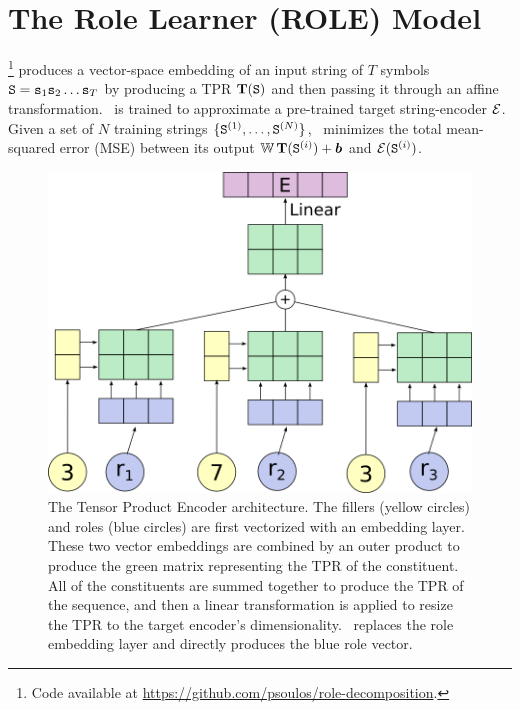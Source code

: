 \section{The Role Learner (ROLE) Model} \label{sec:Role-Learning} 

\RLN\footnote{Code available at \url{https://github.com/psoulos/role-decomposition}.} produces a vector-space embedding of an input string of $T$ symbols ${\mathtt{S}} = {\mathtt{s}}_1 {\mathtt{s}}_2 \ldots {\mathtt{s}}_T$ by producing a TPR ${\mathbf{T}}({\mathtt{S}})$ and then passing it through an affine transformation.
\RLN\ is trained to approximate a pre-trained target string-encoder ${\mathcal{E}}$.
Given a set of $N$ training strings $\{ {\mathtt{S}}^{(1)}, \ldots, {\mathtt{S}}^{(N)} \}$, \RLN\ minimizes the total mean-squared error (MSE) between its output ${\mathbb{W}}\,{\mathbf{T}}({\mathtt{S}}^{(i)}) + {\bm{b}}$ and %
${\mathcal{E}}({\mathtt{S}}^{(i)})$.

\begin{figure}[t]
    \centering
    \includegraphics[scale=.3]{images/rldn/tpdn.png}
    \caption{The Tensor Product Encoder architecture. The fillers (yellow circles) and roles (blue circles) are first vectorized with an embedding layer. These two vector embeddings are combined by an outer product to produce the green matrix representing the TPR of the constituent. All of the constituents are summed together to produce the TPR of the sequence, and then a linear transformation is applied to resize the TPR to the target encoder's dimensionality. \RLN\ replaces the role embedding layer and directly produces the blue role vector.}
    \label{fig:tpe-arch}
\end{figure}


